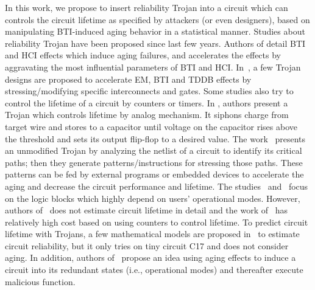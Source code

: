 In this work, we propose to insert reliability Trojan into a circuit which can controls the circuit lifetime as specified by attackers (or even designers), based on manipulating BTI-induced aging behavior in a statistical manner. Studies about reliability Trojan have been proposed since last few years. Authors of \cite{shiyanovskii2010process} detail BTI and HCI effects which induce aging failures, and accelerates the effects by aggravating the most influential parameters of BTI and HCI. In~\cite{sreedhar2012reliability}, a few Trojan designs are proposed to accelerate EM, BTI and TDDB effects by stressing/modifying specific interconnects and gates. Some studies also try to control the lifetime of a circuit by counters or timers. In \cite{yang2016a2}, authors present a Trojan which controls lifetime by analog mechanism. It siphons charge from target wire and stores to a capacitor until voltage on the capacitor rises above the threshold and sets its output flip-flop to a desired value.  The work~\cite{karimi2015magic} presents an unmodified Trojan by analyzing the netlist of a circuit to identify its critical paths; then they generate patterns/instructions for stressing those paths. These patterns can be fed by external programs or embedded devices to accelerate the aging and decrease the circuit performance and lifetime. The studies~\cite{yang2016a2} and~\cite{karimi2015magic} focus on the logic blocks which highly depend on users' operational modes. However, authors of~\cite{shiyanovskii2010process} does not estimate circuit lifetime in detail and the work of~\cite{sreedhar2012reliability} has relatively high cost based on using counters to control lifetime. To predict circuit lifetime with Trojans, a few mathematical models are proposed in~\cite{burman2012effect} to estimate circuit reliability, but it only tries on tiny circuit C17 and does not consider aging. In addition, authors of~\cite{wei2013undetectable} propose an idea using aging effects to induce a circuit into its redundant states (i.e., operational modes) and thereafter execute malicious function.

